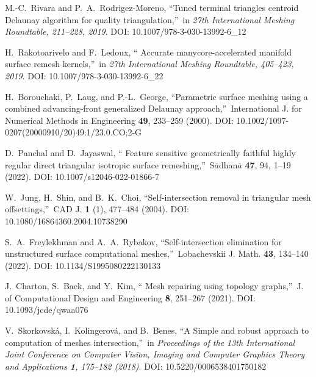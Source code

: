 \documentclass[
11pt,
tightenlines,
twoside,
onecolumn,
nofloats,
nobibnotes,
nofootinbib,
superscriptaddress,
noshowpacs,
centertags]
{revtex4-2}
\begin{document}
\begin{thebibliography}{99}
 M.-C.~Rivara and P.~A.~Rodrigez-Moreno,
\textquotedblleft Tuned terminal  triangles centroid Delaunay
algorithm for quality triangulation,\textquotedblright \ in
\textit{27th International Meshing Roundtable, 211--228, 2019}. DOI: 10.1007/978-3-030-13992-6\_12

 H.~Rakotoarivelo and F.~Ledoux, \textquotedblleft
Accurate manycore-accelerated  manifold surface remesh
kernels,\textquotedblright \ in \textit{27th International Meshing
Roundtable, 405--423, 2019}. DOI: 10.1007/978-3-030-13992-6\_22

 H.~Borouchaki, P.~Laug, and P.-L.~George,
\textquotedblleft Parametric surface meshing using a combined
advancing-front generalized Delaunay approach,\textquotedblright \
International J. for Numerical Methods in Engineering {\bf 49},
233--259 (2000). DOI: 10.1002/1097-0207(20000910/20)49:1/23.0.CO;2-G

 D.~Panchal and D.~Jayaswal, \textquotedblleft
Feature  sensitive geometrically faithful highly regular direct
triangular isotropic surface remeshing,\textquotedblright \
S$\bar{a}$dhan$\bar{a}$ {\bf 47}, 94, 1--19 (2022). DOI: 10.1007/s12046-022-01866-7

\bibitem{Jung}
 W.~Jung, H.~Shin, and B.~K.~Choi,
\textquotedblleft Self-intersection  removal in triangular mesh
offsettings,\textquotedblright \ CAD J. {\bf 1} (1), 477--484
(2004). DOI: 10.1080/16864360.2004.10738290

 S.~A.~Freylekhman and A.~A.~Rybakov,
\textquotedblleft Self-intersection elimination  for unstructured
surface computational meshes,\textquotedblright \ Lobachevskii J.
Math. {\bf 43}, 134--140 (2022). DOI: 10.1134/S1995080222130133

\bibitem{Charton}
 J.~Charton, S.~Baek, and Y.~Kim, \textquotedblleft
Mesh repairing using topology graphs,\textquotedblright \ J. of
Computational Design and Engineering {\bf 8}, 251--267 (2021). DOI: 10.1093/jcde/qwaa076

\bibitem{Skvorkovska}
 V.~Skorkovsk\'a, I.~Kolingerov\'a, and B.~Benes,
\textquotedblleft A Simple  and robust approach to computation of
meshes intersection,\textquotedblright \ in \textit{Proceedings of
the 13th International Joint Conference on Computer Vision, Imaging
and Computer Graphics Theory and Applications {\bf 1}, 175--182
(2018)}. DOI: 10.5220/0006538401750182

\end{thebibliography}
\end{document}
